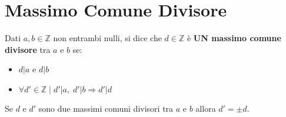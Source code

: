 \section{Massimo Comune Divisore}
Dati $a,b \in \mathbb{Z}$ non entrambi nulli, si dice che $d \in \mathbb{Z}$ è \textbf{UN massimo comune divisore} tra $a$ e $b$ se:
\begin{itemize}
    \item $d|a$ e $d|b$
    \item $\forall d' \in \mathbb{Z} \; | \; d'|a, \; d'|b \Rightarrow d'|d$
\end{itemize}
Se $d$ e $d'$ sono due massimi comuni divisori tra $a$ e $b$ allora $d' = \pm d$.